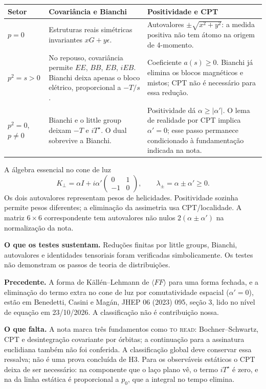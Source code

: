 \documentclass[11pt,a4paper]{article}
\begin{document}
\begin{center}\small
\renewcommand{\arraystretch}{1.35}
\begin{tabular}{@{}p{2.1cm}p{6.7cm}p{6.0cm}@{}}
\toprule
Setor & Covariância e Bianchi & Positividade e CPT\\\midrule
$p=0$ & Estruturas reais simétricas invariantes $xG+y\epsilon$. & Autovalores
$\pm\sqrt{x^2+y^2}$: a medida positiva não tem átomo na origem de 4-momento.\\
$p^2=s>0$ & No repouso, covariância permite $EE$, $BB$, $EB$, $iEB$.
Bianchi deixa apenas o bloco elétrico, proporcional a $-T/s$. &
Coeficiente $a(s)\ge0$. Bianchi já elimina os blocos magnéticos e mistos;
CPT não é necessário para essa redução.\\
$p^2=0$, $p\ne0$ & Bianchi e o little group deixam $-T$ e $iT^\star$.
O dual sobrevive a Bianchi. & Positividade dá $\alpha\ge|\alpha'|$.
O lema de realidade por CPT implica $\alpha'=0$; esse passo permanece
condicionado à fundamentação indicada na nota.\\\bottomrule
\end{tabular}
\end{center}
\begin{panel}{A álgebra essencial no cone de luz}
\begin{equation*}
 K_\perp=\alpha I+i\alpha'\begin{pmatrix}0&1\\-1&0\end{pmatrix},
 \qquad \lambda_\pm=\alpha\pm\alpha'\ge0.
\end{equation*}
Os dois autovalores representam pesos de helicidades. Positividade sozinha
permite pesos diferentes; a eliminação da assimetria usa CPT/localidade.
A matriz $6\times6$ correspondente tem autovalores não nulos
$2(\alpha\pm\alpha')$ na normalização da nota.
\end{panel}
\textbf{O que os testes sustentam.} Reduções finitas por little groups,
Bianchi, autovalores e identidades tensoriais foram verificadas simbolicamente.
Os testes não demonstram os passos de teoria de distribuições.

\textbf{Precedente.} A forma de Källén--Lehmann de $\langle FF\rangle$ para
uma forma fechada, e a eliminação do termo extra no cone de luz por
comutatividade espacial ($\alpha'=0$), estão em Benedetti, Casini e Magán,
JHEP 06 (2023) 095, seção 3, lido no nível de equação em 23/10/2026. A
classificação não é contribuição nossa.

\textbf{O que falta.} A nota marca três fundamentos como \textsc{to read}:
Bochner--Schwartz, CPT e desintegração covariante por órbitas; a continuação
para a assinatura euclidiana também não foi conferida. A classificação
global deve conservar essa ressalva; não é uma prova concluída de H3. Para os
observáveis estáticos o CPT deixa de ser necessário: na componente que o laço
plano vê, o termo $iT^\star$ é zero, e na da linha estática é proporcional a
$p_0$, que a integral no tempo elimina.
\end{document}
